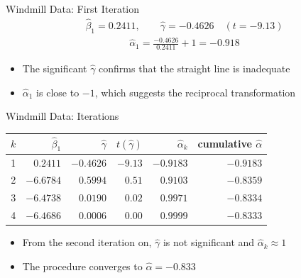 \begin{frame}{Windmill Data: First Iteration}
\begin{align*}
    \hat{\beta}_1 = 0.2411, \qquad \hat{\gamma} = -0.4626 \quad (t = -9.13)
\end{align*}
\begin{align*}
    \hat{\alpha}_1 = \frac{-0.4626}{0.2411} + 1 = -0.918
\end{align*}
\begin{itemize}
    \item The significant $\hat{\gamma}$ confirms that the straight line is inadequate
    \item $\hat{\alpha}_1$ is close to $-1$, which suggests the reciprocal transformation
\end{itemize}
\end{frame}


\begin{frame}{Windmill Data: Iterations}
\begin{center}
{\renewcommand{\arraystretch}{1.2}
\small
\begin{tabular}{rrrrrr}
\toprule
$k$ & $\hat{\beta}_1$ & $\hat{\gamma}$ & $t(\hat{\gamma})$ & $\hat{\alpha}_k$ & cumulative $\hat{\alpha}$ \\
\midrule
1 & $0.2411$ & $-0.4626$ & $-9.13$ & $-0.9183$ & $-0.9183$ \\
2 & $-6.6784$ & $0.5994$ & $0.51$ & $0.9103$ & $-0.8359$ \\
3 & $-6.4738$ & $0.0190$ & $0.02$ & $0.9971$ & $-0.8334$ \\
4 & $-6.4686$ & $0.0006$ & $0.00$ & $0.9999$ & $-0.8333$ \\
\bottomrule
\end{tabular}}
\end{center}
\begin{itemize}
    \item From the second iteration on, $\hat{\gamma}$ is not significant and $\hat{\alpha}_k \approx 1$
    \item The procedure converges to $\hat{\alpha} = -0.833$
\end{itemize}
\end{frame}


